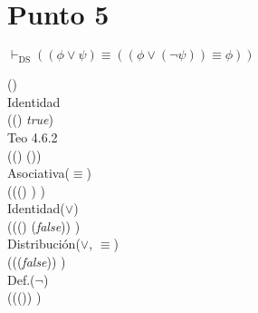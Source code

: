 \documentclass{article}
\begin{document}
\section{Punto 5}
\begin{logicenv}{$\vdash_{\text{DS}} ((\phi \lor \psi) \equiv ((\phi \lor (\neg \psi)) \equiv \phi))$}
    \begin{derivation}
        (\phi \lor \psi)\\
        Identidad\\
        ((\phi \lor \psi) \equiv \textrm{\textit{true}})\\
        Teo 4.6.2\\
        ((\phi \lor \psi) \equiv (\phi \equiv \phi))\\
        Asociativa($\equiv$)\\
        (((\phi \lor \psi) \equiv \phi) \equiv \phi)\\
        Identidad($\lor$)\\
        (((\phi \lor \psi) \equiv (\phi \lor \textrm{\textit{false}})) \equiv \phi)\\
        Distribución($\lor$, $\equiv$)\\
        ((\phi \lor (\psi \equiv \textrm{\textit{false}})) \equiv \phi)\\
        Def.($\neg$)\\
        ((\phi \lor (\neg \psi)) \equiv \phi)
    \end{derivation}
\end{logicenv}
\end{document}
